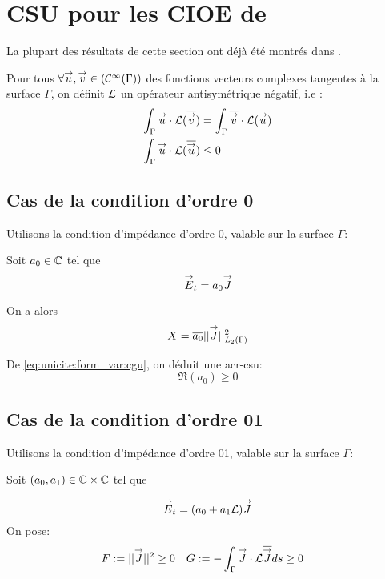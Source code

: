 \section{CSU pour les CIOE de \cite{stupfel_sufficient_2011}}
  La plupart des résultats de cette section ont déjà été montrés dans \cite{stupfel_sufficient_2011}.


  Pour tous \(\forall {\overset{\rightarrow}{u}}, {\overset{\rightarrow}{v}} \in (\mathcal C^\infty(\Gamma))\) des fonctions vecteurs complexes tangentes à la surface \(\Gamma\), on définit \(\mathcal{L}\) un opérateur antisymétrique négatif, i.e :
  \begin{align*}
    \int_\Gamma {\overset{\rightarrow}{u}}\cdot \mathcal{L}({\overline{{\overset{\rightarrow}{v}}}}) &= \int_\Gamma {\overline{{\overset{\rightarrow}{v}}}}\cdot \mathcal{L}({\overset{\rightarrow}{u}})\\
    \int_\Gamma {\overset{\rightarrow}{u}}\cdot \mathcal{L}({\overline{{\overset{\rightarrow}{u}}}}) &\le 0
  \end{align*}

  \subsection{Cas de la condition d'ordre 0}
    Utilisons la condition d’impédance d'ordre 0, valable sur la surface \(\Gamma\):

    Soit \(a_0 \in \mathbb C\) tel que
    \[
      {\overset{\rightarrow}{E}}_t = a_0 {\overset{\rightarrow}{J}}
    \]

    On a alors
    \begin{equation*}
    X = {\overline{a_0}}||{\overset{\rightarrow}{J}}||_{L_2(\Gamma)}^2
    \end{equation*}

    De \eqref{eq:unicite:form_var:cgu}, on déduit une \gls{acr-csu}:
    \begin{equation}
    \Re\left(a_0\right) \ge 0
    \end{equation}

  \subsection{Cas de la condition d'ordre 01}
    Utilisons la condition d’impédance d'ordre 01, valable sur la surface \(\Gamma\):

    Soit \((a_0, a_1) \in \mathbb C\times\mathbb C\) tel que

    \[
      {\overset{\rightarrow}{E}}_t = (a_0 +a_1 \mathcal{L}){\overset{\rightarrow}{J}}
    \]
    On pose:
    \begin{align*}
      F&:= || {\overset{\rightarrow}{J}}|| ^2 \ge 0  & G&:= -\int_\Gamma {\overset{\rightarrow}{J}}\cdot \mathcal{L}{\overline{{\overset{\rightarrow}{J}}}} ds \ge 0
    \end{align*}

